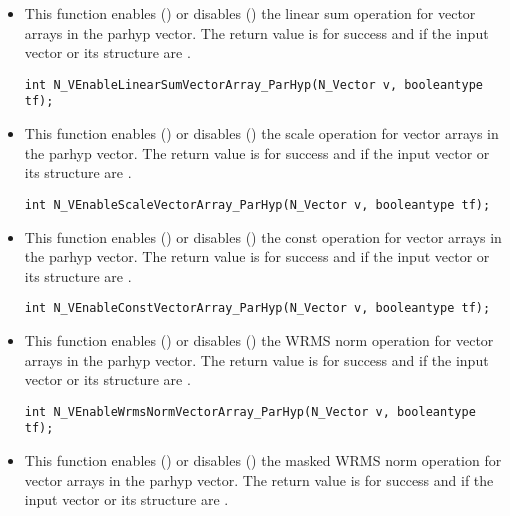\begin{itemize}
\item {}

This function enables () or disables () the linear sum
operation for vector arrays in the parhyp vector. The return value is  for
success and  if the input vector or its  structure are .

\verb|int N_VEnableLinearSumVectorArray_ParHyp(N_Vector v, booleantype tf);|


\item {}

This function enables () or disables () the scale
operation for vector arrays in the parhyp vector. The return value is  for
success and  if the input vector or its  structure are .

\verb|int N_VEnableScaleVectorArray_ParHyp(N_Vector v, booleantype tf);|


\item {}

This function enables () or disables () the const
operation for vector arrays in the parhyp vector. The return value is  for
success and  if the input vector or its  structure are .

\verb|int N_VEnableConstVectorArray_ParHyp(N_Vector v, booleantype tf);|


\item {}

This function enables () or disables () the WRMS norm
operation for vector arrays in the parhyp vector. The return value is  for
success and  if the input vector or its  structure are .

\verb|int N_VEnableWrmsNormVectorArray_ParHyp(N_Vector v, booleantype tf);|


\item {}

This function enables () or disables () the masked WRMS
norm operation for vector arrays in the parhyp vector. The return value is
 for success and  if the input vector or its  structure are
.


\end{itemize}
